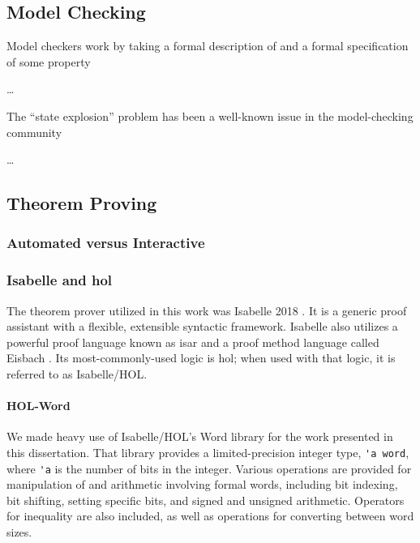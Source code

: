 \subsection{Model Checking}
Model checkers work by taking a formal description of 
and a formal specification of some property 

\todo\dots

The ``state explosion'' problem has been a well-known issue
in the model-checking community \autocite{clarke2012modelchecking} 

\todo\dots

\subsection{Theorem Proving}
%

\subsubsection{Automated versus Interactive}

\subsubsection{Isabelle and \acs*{hol}}
The theorem prover utilized in this work
was Isabelle 2018 \autocite{nipkow2002isabelle}.%
It is a generic proof assistant with a flexible, extensible syntactic framework.
Isabelle also utilizes a powerful proof language
known as \ac{isar}  \autocite{wenzel2007isabelle}
and a proof method language called Eisbach \autocite{matichuk2016eisbach}.
Its most-commonly-used logic is \ac{hol}; when used with that logic,
it is referred to as Isabelle/HOL.

\paragraph{HOL-Word}
We made heavy use of Isabelle/HOL's Word library \autocite{isabelle-word-session}
for the work presented in this dissertation.
That library provides a limited-precision integer type, \lstinline|'a word|,
where \lstinline|'a| is the number of bits in the integer.
Various operations are provided for manipulation of and arithmetic
involving formal words, including bit indexing, bit shifting, setting specific bits,
and signed and unsigned arithmetic.
Operators for inequality are also included,
as well as operations for converting between word sizes.

